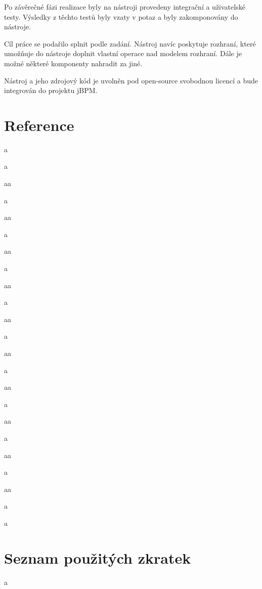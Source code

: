 \documentclass[11pt,twoside,a4paper]{book}
\begin{document}
Po závěrečné fázi realizace byly na nástroji provedeny integrační a uživatelské testy.
Výsledky z těchto testů byly vzaty v potaz a byly zakomponovány do nástroje.

Cíl práce se podařilo splnit podle zadání. Nástroj navíc poskytuje rozhraní, které umožňuje do
nástroje doplnit vlastní operace nad modelem rozhraní. Dále je možné některé komponenty
nahradit za jiné.

Nástroj a jeho zdrojový kód je uvolněn pod open-source svobodnou licencí a bude integrován
do projektu jBPM.

\chapter{Reference}
a

a

aa

a

aa

a

aa

a

aa

a

aa

a

aa

a

aa

a

aa

a

aa

a 

aa

a

a


%

\appendix

\chapter{Seznam použitých zkratek}
a
\end{document}
